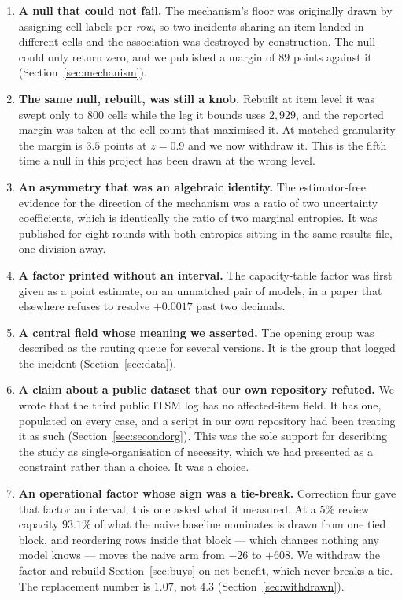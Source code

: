 \documentclass[preprint,12pt]{elsarticle}
\begin{document}
\begin{enumerate}
\item \textbf{A null that could not fail.} The mechanism's floor was
originally drawn by assigning cell labels per \emph{row}, so two incidents
sharing an item landed in different cells and the association was destroyed
by construction. The null could only return zero, and we published a margin
of $89$ points against it (Section~\ref{sec:mechanism}).

\item \textbf{The same null, rebuilt, was still a knob.} Rebuilt at item
level it was swept only to $800$ cells while the leg it bounds uses
$2{,}929$, and the reported margin was taken at the cell count that maximised
it. At matched granularity the margin is $3.5$ points at $z=0.9$ and we now
withdraw it. This is the fifth time a null in this project has been drawn at
the wrong level.

\item \textbf{An asymmetry that was an algebraic identity.} The
estimator-free evidence for the direction of the mechanism was a ratio of two
uncertainty coefficients, which is identically the ratio of two marginal
entropies. It was published for eight rounds with both entropies sitting in
the same results file, one division away.

\item \textbf{A factor printed without an interval.} The capacity-table
factor was first given as a point estimate, on an unmatched pair of models,
in a paper that elsewhere refuses to resolve $+0.0017$ past two decimals.

\item \textbf{A central field whose meaning we asserted.} The opening group
was described as the routing queue for several versions. It is the group that
logged the incident (Section~\ref{sec:data}).

\item \textbf{A claim about a public dataset that our own repository
refuted.} We wrote that the third public ITSM log has no affected-item field.
It has one, populated on every case, and a script in our own repository had
been treating it as such (Section~\ref{sec:secondorg}). This was the sole
support for describing the study as single-organisation of necessity, which
we had presented as a constraint rather than a choice. It was a choice.

\item \textbf{An operational factor whose sign was a tie-break.} Correction
four gave that factor an interval; this one asked what it measured. At a
$5\%$ review capacity $93.1\%$ of what the naive baseline nominates is drawn
from one tied block, and reordering rows inside that block --- which changes
nothing any model knows --- moves the naive arm from $-26$ to $+608$. We
withdraw the factor and rebuild Section~\ref{sec:buys} on net benefit, which
never breaks a tie. The replacement number is $1.07$, not $4.3$
(Section~\ref{sec:withdrawn}).


\end{enumerate}
\end{document}
